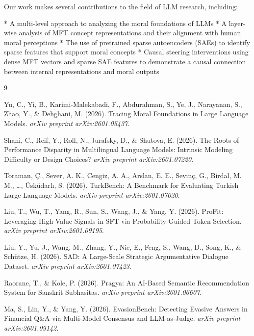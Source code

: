 \documentclass{article}
\begin{document}
Our work makes several contributions to the field of LLM research, including:

* A multi-level approach to analyzing the moral foundations of LLMs
* A layer-wise analysis of MFT concept representations and their alignment with human moral perceptions
* The use of pretrained sparse autoencoders (SAEs) to identify sparse features that support moral concepts
* Causal steering interventions using dense MFT vectors and sparse SAE features to demonstrate a causal connection between internal representations and moral outputs

\begin{thebibliography}{9}

Yu, C., Yi, B., Karimi-Malekabadi, F., Abdurahman, S., Ye, J., Narayanan, S., Zhao, Y., \& Dehghani, M. (2026). Tracing Moral Foundations in Large Language Models. \emph{arXiv preprint arXiv:2601.05437}.

Shani, C., Reif, Y., Roll, N., Jurafsky, D., \& Shutova, E. (2026). The Roots of Performance Disparity in Multilingual Language Models: Intrinsic Modeling Difficulty or Design Choices? \emph{arXiv preprint arXiv:2601.07220}.

Toraman, Ç., Sever, A. K., Cengiz, A. A., Arslan, E. E., Sevinç, G., Birdal, M. M., \ldots, Üsküdarlı, S. (2026). TurkBench: A Benchmark for Evaluating Turkish Large Language Models. \emph{arXiv preprint arXiv:2601.07020}.

Liu, T., Wu, T., Yang, R., Sun, S., Wang, J., \& Yang, Y. (2026). ProFit: Leveraging High-Value Signals in SFT via Probability-Guided Token Selection. \emph{arXiv preprint arXiv:2601.09195}.

Liu, Y., Yu, J., Wang, M., Zhang, Y., Nie, E., Feng, S., Wang, D., Song, K., \& Schütze, H. (2026). SAD: A Large-Scale Strategic Argumentative Dialogue Dataset. \emph{arXiv preprint arXiv:2601.07423}.

Raorane, T., \& Kole, P. (2026). Pragya: An AI-Based Semantic Recommendation System for Sanskrit Subhasitas. \emph{arXiv preprint arXiv:2601.06607}.

Ma, S., Lin, Y., \& Yang, Y. (2026). EvasionBench: Detecting Evasive Answers in Financial Q\&A via Multi-Model Consensus and LLM-as-Judge. \emph{arXiv preprint arXiv:2601.09142}.


\end{thebibliography}
\end{document}

